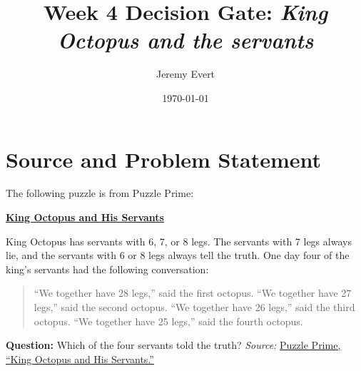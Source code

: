 \documentclass[11pt]{article}
\title{Week 4 Decision Gate: \emph{King Octopus and the servants}}
\author{Jeremy Evert}
\date{\today}
\begin{document}
\maketitle

\section*{Source and Problem Statement} The following puzzle is from Puzzle Prime: \begin{center} \href{https://www.puzzleprime.com/puzzles/brain-teasers/deduction/king-octopus-and-his-servants/} {\textbf{King Octopus and His Servants}} \end{center} King Octopus has servants with 6, 7, or 8 legs. The servants with 7 legs always lie, and the servants with 6 or 8 legs always tell the truth. One day four of the king's servants had the following conversation: \begin{quote} ``We together have 28 legs,'' said the first octopus. ``We together have 27 legs,'' said the second octopus. ``We together have 26 legs,'' said the third octopus. ``We together have 25 legs,'' said the fourth octopus. \end{quote} \textbf{Question:} Which of the four servants told the truth? \medskip \noindent \textit{Source:} \href{https://www.puzzleprime.com/puzzles/brain-teasers/deduction/king-octopus-and-his-servants/} {Puzzle Prime, ``King Octopus and His Servants.''}
\end{document}

